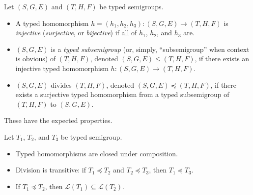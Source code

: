 \documentclass[a4paper,UKenglish,cleveref, autoref, thm-restate, anonymous]{lipics-v2021}
\begin{document}
\begin{definition}
    Let $(S, G, E)$ and $(T, H, F)$ be typed semigroups.
    \begin{itemize}
        \item A typed homomorphism $h = (h_1, h_2, h_3) : (S, G, E) \rightarrow (T, H, F)$ is \emph{injective} (\emph{surjective}, or \emph{bijective}) if all of $h_1$, $h_2$, and $h_3$ are.
        \item $(S, G, E)$ is a \emph{typed subsemigroup} (or, simply, ``subsemigroup'' when context is obvious) of $(T, H, F)$, denoted $(S, G, E) \leq (T, H, F)$, if there exists an injective typed homomorphism $h : (S, G, E) \rightarrow (T, H, F)$.
        \item $(S, G, E)$ divides $(T, H, F)$, denoted $(S, G, E) \preceq (T, H, F)$, if there exists a surjective  typed homomorphism from a typed subsemigroup of $(T, H, F)$ to $(S, G, E)$.
        \iffalse TODO: remove before submission
            \item A  typed semigroup $(S, G', E)$ is a \emph{shift} of $(S, G, E)$ if there exist $p,q \in S$, with \[G' = \{\{s \in S \mid psq \in A\} \mid A \in G\}.\]
            \item Let $E' \subseteq S$ be any finite set. Then, we call $(S, G, E')$ a \emph{unit relaxation} of $(S, G, E)$.
        \fi
    \end{itemize}
\end{definition}

These have the expected properties.
\begin{proposition}\label{prop:typedsemigroupprops}
    Let $T_1$, $T_2$, and $T_3$ be typed semigroup.
    \begin{itemize}
        \item Typed homomorphisms are closed under composition.
        \item Division is transitive: if $T_1 \preceq T_2$ and $T_2 \preceq T_3$, then $T_1 \preceq T_3$.
        \item If $T_1 \preceq T_2$, then $\mathcal{L}(T_1) \subseteq \mathcal{L}(T_2)$.
    \end{itemize}
\end{proposition}
\end{document}
